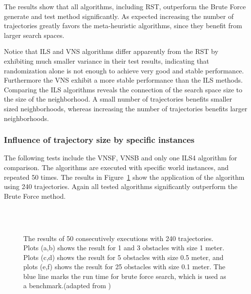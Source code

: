The results show that all algorithms, including RST, outperform the Brute Force generate and test method significantly. 
As expected increasing the number of trajectories greatly favors the meta-heuristic algorithms, since they benefit from larger search spaces. 

Notice that ILS and VNS algorithms differ apparently from the RST by exhibiting much smaller variance in their test results, indicating that randomization alone is not enough to achieve very good and stable performance.
Furthermore the VNS exhibit a more stable performance than the ILS methods. 
Comparing the ILS algorithms reveals the connection of the search space size to the size of the neighborhood. 
A small number of trajectories benefits smaller sized neighborhoods, whereas increasing the number of trajectories benefits larger neighborhoods. 

\subsubsection{Influence of trajectory size by specific instances}
The following tests include the VNSF, VNSB and only one ILS4 algorithm for comparison. 
The algorithms are executed with specific world instances, and repeated 50 times. 
The results in Figure~\ref{fig:fig_special_240} show the application of the algorithm using 240 trajectories. Again  all tested algorithms significantly outperform the Brute Force method. 

\begin{figure}[thpb]
   \myfloatalign
    \tiny
          \centering
    \\
    \\
    \caption[Experiment: Specific instances with 240 trajectories]{The results of 50 consecutively executions with 240 trajectories. Plots (a,b) shows the result for 1 and 3 obstacles with size 1 meter. Plots (c,d) shows the result for 5 obstacles with size 0.5 meter, and plots (e,f) shows the result for 25 obstacles with size 0.1 meter. The blue line marks the run time for brute force search, which is used as a benchmark.(adapted from \cite{myself})}  
     \label{fig:fig_special_240}
\end{figure}

